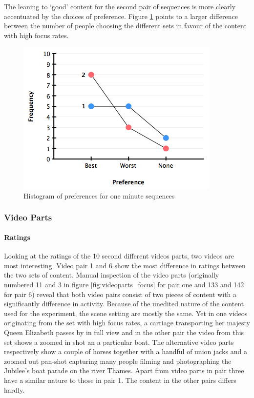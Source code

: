 The leaning to `good' content for the second pair of sequences is more clearly accentuated by the choices of preference. Figure \ref{fig:evalSeqsPref} points to a larger difference between the number of people choosing the different sets in favour of the content with high focus rates. 

\begin{figure}[htbp]
  \centering
    \includegraphics[width=.6\textwidth]{img/evaluation/pref_seqs_all}
  \caption{Histogram of preferences for one minute sequences}
  \label{fig:evalSeqsPref}
\end{figure}

\subsubsection{Video Parts}
\paragraph{Ratings}

Looking at the ratings of the 10 second different videos parts, two videos are most interesting. Video pair 1 and 6 show the most difference in ratings between the two sets of content. Manual inspection of the video parts (originally numbered 11 and 3 in figure \ref{fig:videoparts_focus} for pair one and 133 and 142 for pair 6) reveal that both video pairs consist of two pieces of content with a significantly difference in activity. Because of the unedited nature of the content used for the experiment, the scene setting are mostly the same. Yet in one videos originating from the set with high focus rates, a carriage transporting her majesty Queen Elizabeth passes by in full view and in the other pair the video from this set shows a zoomed in shot an a particular boat. The alternative video parts respectively show a couple of horses together with a handful of union jacks and a zoomed out pan-shot capturing many people filming and photographing the Jubilee's boat parade on the river Thames. Apart from video parts in pair three have a similar nature to those in pair 1. The content in the other pairs differs hardly.

